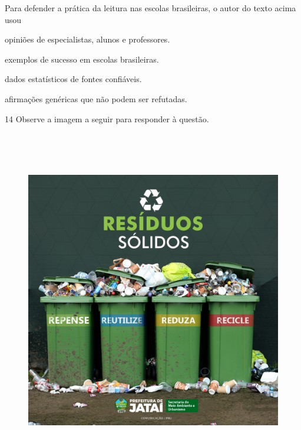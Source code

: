 Para defender a prática da leitura nas escolas brasileiras, o autor do texto 
acima usou 

\begin{escolha}

    \item opiniões de especialistas, alunos e professores.

    \item exemplos de sucesso em escolas brasileiras. 

    \item dados estatísticos de fontes confiáveis.

    \item afirmações genéricas que não podem ser refutadas. 

\end{escolha}

\pagebreak

\num{14} Observe a imagem a seguir para responder à questão.

\begin{figure}[H]
\includegraphics[width=5.90551in,height=5.90278in]{./imgSAEB_7_POR/media/image19.png}
\end{figure}

